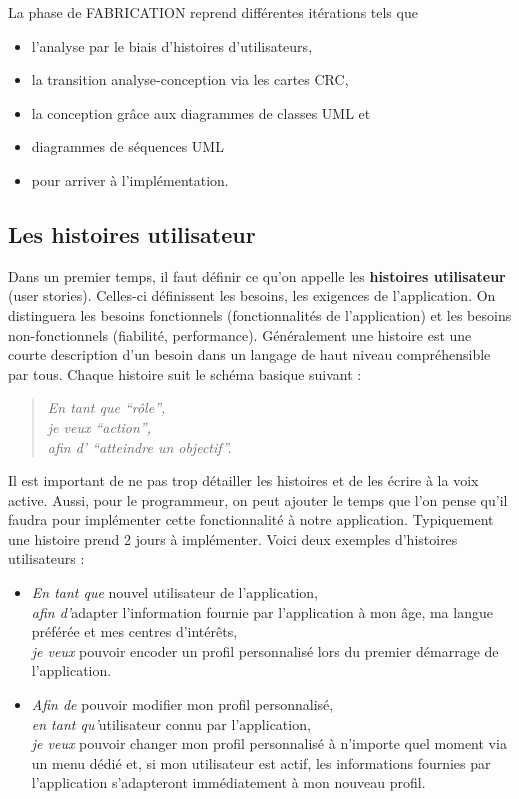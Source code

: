 La phase de FABRICATION reprend différentes itérations tels que
\begin{itemize}
  \item l'analyse par le biais d'histoires d'utilisateurs,
  \item la transition analyse-conception via les cartes CRC,
  \item la conception grâce aux diagrammes de classes UML et
  \item diagrammes de séquences UML
  \item pour arriver à l'implémentation.
\end{itemize}

\subsection{Les histoires utilisateur}
Dans un premier temps,
il faut définir ce qu'on appelle les
\textbf{histoires utilisateur} (user stories).
Celles-ci définissent les besoins,
les exigences de l'application.
On distinguera les besoins fonctionnels (fonctionnalités de l'application) et
les besoins non-fonctionnels (fiabilité, performance).
Généralement une histoire est une courte description d'un besoin
dans un langage de haut niveau compréhensible par tous.
Chaque histoire suit le schéma basique suivant :
\begin{quote}
  \emph{En tant que ``rôle'',
  \\je veux ``action'',
  \\afin d' ``atteindre un objectif''.}
\end{quote}
Il est important de ne pas trop détailler les histoires
et de les écrire à la voix active.
Aussi, pour le programmeur,
on peut ajouter le temps que l'on pense qu'il faudra pour
implémenter cette fonctionnalité à notre application.
Typiquement une histoire prend 2 jours à implémenter.
Voici deux exemples d'histoires utilisateurs :
\begin{itemize}
  \item \emph{En tant que} nouvel utilisateur de l'application,\\
    \emph{afin d'}adapter l'information fournie par l'application à mon âge,
    ma langue préférée et mes centres d'intérêts,\\
    \emph{je veux} pouvoir encoder un profil
    personnalisé lors du premier démarrage de l'application.
  \item	\emph{Afin de} pouvoir modifier mon profil personnalisé,\\
    \emph{en tant qu'}utilisateur connu par l'application,\\
    \emph{je veux} pouvoir changer mon profil personnalisé à n'importe
    quel moment via un menu dédié et,
    si mon utilisateur est actif,
    les informations fournies par l'application s'adapteront immédiatement
    à mon nouveau profil.
\end{itemize}

